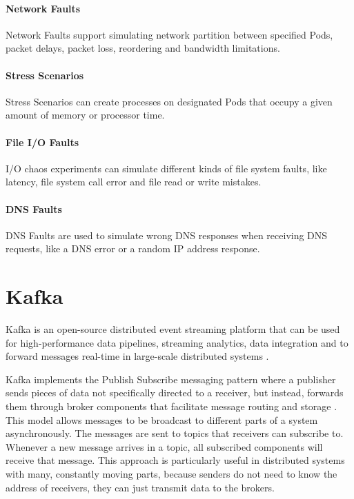 \paragraph{Network Faults} Network Faults support simulating network partition between specified Pods, packet delays, packet loss, reordering and bandwidth limitations.

\paragraph{Stress Scenarios} Stress Scenarios can create processes on designated Pods that occupy a given amount of memory or processor time.

\paragraph{File I/O Faults} I/O chaos experiments can simulate different kinds of file system faults, like latency, file system call error and file read or write mistakes.

\paragraph{DNS Faults} DNS Faults are used to simulate wrong DNS responses when receiving DNS requests, like a DNS error or a random IP address response.

\section{Kafka} \label{background-kafka}

Kafka is an open-source distributed event streaming platform that can be used for high-performance data pipelines, streaming analytics, data integration and to forward messages real-time in large-scale distributed systems \cite{Kafka}.

Kafka implements the Publish Subscribe messaging pattern where a publisher sends pieces of data not specifically directed to a receiver, but instead, forwards them through broker components that facilitate message routing and storage \cite{KafkaDefinitive}. This model allows messages to be broadcast to different parts of a system asynchronously. The messages are sent to topics that receivers can subscribe to. Whenever a new message arrives in a topic, all subscribed components will receive that message. This approach is particularly useful in distributed systems with many, constantly moving parts, because senders do not need to know the address of receivers, they can just transmit data to the brokers.

